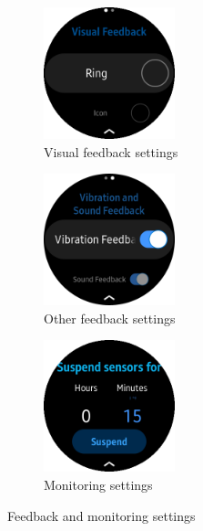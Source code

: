\documentclass[conference, a4paper, 10pt, twocolumn]{IEEEtran}
\begin{document}
\begin{figure}[t!]
    \centering
    \begin{subfigure}[t]{0.32\textwidth}
        \centering
        \includegraphics[height=1.5in]{img/settingsVisualFeedback.png}
        \caption{Visual feedback settings}
        \label{fig:visualFeedbackSettings}
    \end{subfigure}%
    \begin{subfigure}[t]{0.32\textwidth}
        \centering
        \includegraphics[height=1.5in]{img/settingsOtherFeedback.png}
        \caption{Other feedback settings}
        \label{fig:otherFeedbackSettings}
    \end{subfigure}
    \begin{subfigure}[t]{0.32\textwidth}
        \centering
        \includegraphics[height=1.5in]{img/settingsSuspend.png}
        \caption{Monitoring settings}
        \label{fig:monitoringSettings}
    \end{subfigure}
    \caption{Feedback and monitoring settings}
    \label{fig:feedbackSettingsImage}
\end{figure}
\end{document}
